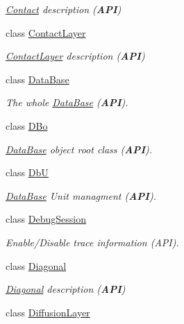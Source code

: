 \begin{DoxyCompactItemize}
\begin{DoxyCompactList}\small\item\em \mbox{\hyperlink{classHurricane_1_1Contact}{Contact}} description ({\bfseries A\+PI}) \end{DoxyCompactList}\item 
class \mbox{\hyperlink{classHurricane_1_1ContactLayer}{Contact\+Layer}}
\begin{DoxyCompactList}\small\item\em \mbox{\hyperlink{classHurricane_1_1ContactLayer}{Contact\+Layer}} description ({\bfseries A\+PI}) \end{DoxyCompactList}\item 
class \mbox{\hyperlink{classHurricane_1_1DataBase}{Data\+Base}}
\begin{DoxyCompactList}\small\item\em The whole \mbox{\hyperlink{classHurricane_1_1DataBase}{Data\+Base}} ({\bfseries A\+PI}). \end{DoxyCompactList}\item 
class \mbox{\hyperlink{classHurricane_1_1DBo}{D\+Bo}}
\begin{DoxyCompactList}\small\item\em \mbox{\hyperlink{classHurricane_1_1DataBase}{Data\+Base}} object root class ({\bfseries A\+PI}). \end{DoxyCompactList}\item 
class \mbox{\hyperlink{classHurricane_1_1DbU}{DbU}}
\begin{DoxyCompactList}\small\item\em \mbox{\hyperlink{classHurricane_1_1DataBase}{Data\+Base}} Unit managment ({\bfseries A\+PI}). \end{DoxyCompactList}\item 
class \mbox{\hyperlink{classHurricane_1_1DebugSession}{Debug\+Session}}
\begin{DoxyCompactList}\small\item\em Enable/\+Disable trace information ({\ttfamily A\+PI}). \end{DoxyCompactList}\item 
class \mbox{\hyperlink{classHurricane_1_1Diagonal}{Diagonal}}
\begin{DoxyCompactList}\small\item\em \mbox{\hyperlink{classHurricane_1_1Diagonal}{Diagonal}} description ({\bfseries A\+PI}) \end{DoxyCompactList}\item 
class \mbox{\hyperlink{classHurricane_1_1DiffusionLayer}{Diffusion\+Layer}}

\end{DoxyCompactItemize}

